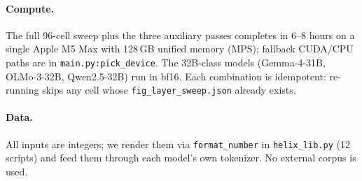 \documentclass[10pt,letterpaper]{article}
\begin{document}
\paragraph{Compute.} The full 96-cell sweep plus the three auxiliary
passes completes in 6--8 hours on a single Apple M5 Max with 128\,GB
unified memory (MPS); fallback CUDA/CPU paths are in
\texttt{main.py:pick\_device}. The 32B-class models (Gemma-4-31B,
OLMo-3-32B, Qwen2.5-32B) run in bf16. Each combination is idempotent:
re-running skips any cell whose \texttt{fig\_layer\_sweep.json}
already exists.

\paragraph{Data.} All inputs are integers; we render them via
\texttt{format\_number} in \texttt{helix\_lib.py} (12 scripts) and
feed them through each model's own tokenizer. No external corpus is
used.
\end{document}
